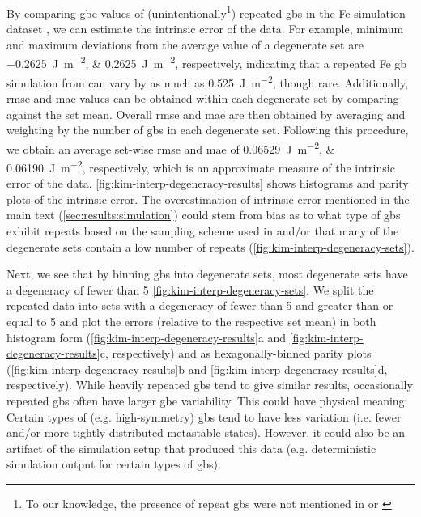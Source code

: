 \documentclass[preprint,12pt]{elsarticle}
\begin{document}
	By comparing \gls{gbe} values of (unintentionally\footnote{To our knowledge, the presence of repeat \glspl{gb} were not mentioned in \cite{kimPhasefieldModeling3D2014} or \cite{kimIdentificationSchemeGrain2011}}) repeated \glspl{gb} in the Fe simulation dataset \cite{kimPhasefieldModeling3D2014}, we can estimate the intrinsic error of the \inpt{} data. For example, minimum and maximum deviations from the average value of a degenerate set are \SIlist{-0.2625;0.2625}{\joule\per\square\meter}, respectively, indicating that a repeated Fe \gls{gb} simulation from \cite{kimPhasefieldModeling3D2014} can vary by as much as \SI{0.525}{\joule\per\square\meter}, though rare. Additionally, \Gls{rmse} and \gls{mae} values can be obtained within each degenerate set by comparing against the set mean. Overall \gls{rmse} and \gls{mae} are then obtained by averaging and weighting by the number of \glspl{gb} in each degenerate set. Following this procedure, we obtain an average set-wise \gls{rmse} and \gls{mae} of \SIlist{0.06529;0.06190}{\joule\per\square\meter}, respectively, which is an approximate measure of the intrinsic error of the data. \cref{fig:kim-interp-degeneracy-results} shows histograms and parity plots of the intrinsic error. The overestimation of intrinsic error mentioned in the main text (\cref{sec:results:simulation}) could stem from bias as to what type of \glspl{gb} exhibit repeats based on the sampling scheme used in \cite{kimPhasefieldModeling3D2014} and/or that many of the degenerate sets contain a low number of repeats (\cref{fig:kim-interp-degeneracy-sets}).
	
	Next, we see that by binning \glspl{gb} into degenerate sets, most degenerate sets have a degeneracy of fewer than 5 \cref{fig:kim-interp-degeneracy-sets}. We split the repeated data into sets with a degeneracy of fewer than 5 and greater than or equal to 5 and plot the errors (relative to the respective set mean) in both histogram form (\cref{fig:kim-interp-degeneracy-results}a and \cref{fig:kim-interp-degeneracy-results}c, respectively) and as hexagonally-binned parity plots (\cref{fig:kim-interp-degeneracy-results}b and \cref{fig:kim-interp-degeneracy-results}d, respectively). While heavily repeated \glspl{gb} tend to give similar results, occasionally repeated \glspl{gb} often have larger \gls{gbe} variability. This could have physical meaning: Certain types of (e.g. high-symmetry) \glspl{gb} tend to have less variation (i.e. fewer and/or more tightly distributed metastable states). However, it could also be an artifact of the simulation setup that produced this data (e.g. deterministic simulation output for certain types of \glspl{gb}).
	
\end{document}
